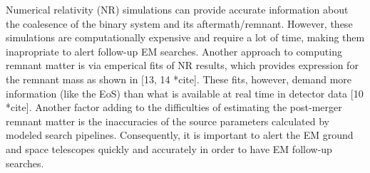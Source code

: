 

Numerical relativity (NR) simulations can provide accurate information about the coalesence of the binary system and its aftermath/remnant. However, these simulations are computationally expensive and require a lot of time, making them inapropriate to alert follow-up EM searches. Another approach to computing
remnant matter is via emperical fits of NR results, which provides expression for the remnant mass as shown in [13, 14 *cite]. These fits, however, demand more information (like the EoS) than what is available at real time in detector data [10 *cite]. Another factor adding to the difficulties of estimating the post-merger remnant matter is the inaccuracies of the source parameters calculated by modeled search pipelines. Consequently, it is important to alert the EM ground and space telescopes quickly and accurately in order to have EM follow-up searches.


